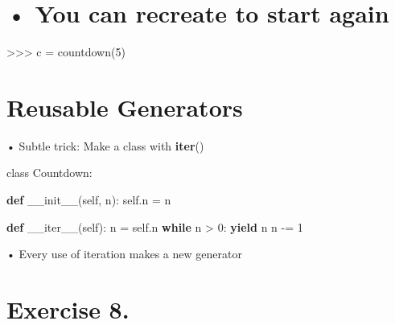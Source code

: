 \documentclass[
  letterpaper,
  DIV=11,
  numbers=noendperiod]{scrreprt}
\newenvironment{Shaded}{\begin{snugshade}}{\end{snugshade}}
\newcommand{\ControlFlowTok}[1]{\textcolor[rgb]{0.00,0.23,0.31}{\textbf{#1}}}
\newcommand{\DecValTok}[1]{\textcolor[rgb]{0.68,0.00,0.00}{#1}}
\newcommand{\FunctionTok}[1]{\textcolor[rgb]{0.28,0.35,0.67}{#1}}
\newcommand{\KeywordTok}[1]{\textcolor[rgb]{0.00,0.23,0.31}{\textbf{#1}}}
\newcommand{\NormalTok}[1]{\textcolor[rgb]{0.00,0.23,0.31}{#1}}
\newcommand{\OperatorTok}[1]{\textcolor[rgb]{0.37,0.37,0.37}{#1}}
\newcommand{\VariableTok}[1]{\textcolor[rgb]{0.07,0.07,0.07}{#1}}
\begin{document}

\chapter{• You can recreate to start
again}\label{you-can-recreate-to-start-again}

\begin{Shaded}
\begin{Highlighting}[]
\OperatorTok{\textgreater{}\textgreater{}\textgreater{}}\NormalTok{ c }\OperatorTok{=}\NormalTok{ countdown(}\DecValTok{5}\NormalTok{) }
\end{Highlighting}
\end{Shaded}


\chapter{Reusable Generators}\label{reusable-generators}

• Subtle trick: Make a class with \textbf{iter}()

class Countdown:

\begin{Shaded}
\begin{Highlighting}[]
\KeywordTok{def} \FunctionTok{\_\_init\_\_}\NormalTok{(}\VariableTok{self}\NormalTok{, n):}
    \VariableTok{self}\NormalTok{.n }\OperatorTok{=}\NormalTok{ n }
\end{Highlighting}
\end{Shaded}

\begin{Shaded}
\begin{Highlighting}[]
\KeywordTok{def} \FunctionTok{\_\_iter\_\_}\NormalTok{(}\VariableTok{self}\NormalTok{):}
\NormalTok{    n }\OperatorTok{=} \VariableTok{self}\NormalTok{.n}
\ControlFlowTok{while}\NormalTok{ n }\OperatorTok{\textgreater{}} \DecValTok{0}\NormalTok{:}
    \ControlFlowTok{yield}\NormalTok{ n}
\NormalTok{    n }\OperatorTok{{-}=} \DecValTok{1} 
\end{Highlighting}
\end{Shaded}

• Every use of iteration makes a new generator


\chapter{Exercise 8.}\label{exercise-8.}
\end{document}
